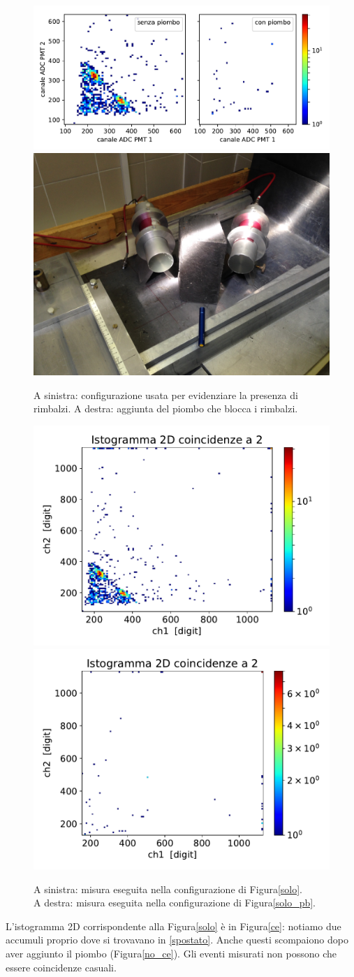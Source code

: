 \begin{figure}[h]
\centering
\subfloat
{\includegraphics[width=17 em]{immagini/rimb} \label{solo} }
\subfloat
{\includegraphics[width=17 em]{immagini/norimb} \label{solo_pb}}
\caption{A sinistra: configurazione usata per evidenziare la presenza di rimbalzi. A destra: aggiunta del piombo che blocca i rimbalzi.}
\end{figure}

\begin{figure}[h]
\centering
\subfloat
{
\includegraphics[width=18 em]{immagini/ce_ri}
\label{ce}
}
\subfloat
{
\includegraphics[width=18 em]{immagini/ce_pb}
\label{no_ce}
}
\caption{A sinistra: misura eseguita nella configurazione di Figura\autoref{solo}.\\
A destra: misura eseguita nella configurazione di Figura\autoref{solo_pb}.}
\end{figure}

L'istogramma 2D corrispondente alla Figura\autoref{solo} è in Figura\autoref{ce}: notiamo due accumuli proprio dove si trovavano in \autoref{spostato}. Anche questi scompaiono dopo aver aggiunto il piombo (Figura\autoref{no_ce}). Gli eventi misurati non possono che essere coincidenze casuali.

